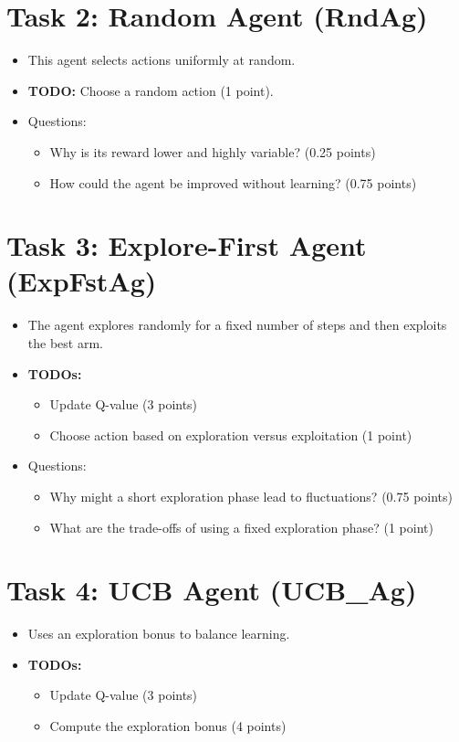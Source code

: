 \documentclass[12pt]{article}
\begin{document}
{{{\section{Task 2: Random Agent (RndAg)}
\begin{itemize}[noitemsep]
    \item This agent selects actions uniformly at random.
    \item \textbf{TODO:} Choose a random action (1 point).
    \item Questions:
    \begin{itemize}[noitemsep]
        \item Why is its reward lower and highly variable? (0.25 points)
        \item How could the agent be improved without learning? (0.75 points)
    \end{itemize}
\end{itemize}

\section{Task 3: Explore-First Agent (ExpFstAg)}
\begin{itemize}[noitemsep]
    \item The agent explores randomly for a fixed number of steps and then exploits the best arm.
    \item \textbf{TODOs:}
    \begin{itemize}[noitemsep]
        \item Update Q-value (3 points)
        \item Choose action based on exploration versus exploitation (1 point)
    \end{itemize}
    \item Questions:
    \begin{itemize}[noitemsep]
        \item Why might a short exploration phase lead to fluctuations? (0.75 points)
        \item What are the trade-offs of using a fixed exploration phase? (1 point)
    \end{itemize}
\end{itemize}

\section{Task 4: UCB Agent (UCB\_Ag)}
\begin{itemize}[noitemsep]
    \item Uses an exploration bonus to balance learning.
    \item \textbf{TODOs:}
    \begin{itemize}[noitemsep]
        \item Update Q-value (3 points)
        \item Compute the exploration bonus (4 points)
    \end{itemize}
\end{itemize}

}}}
\end{document}

